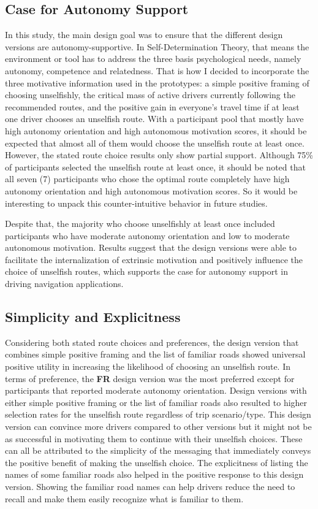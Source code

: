 \subsection{Case for Autonomy Support}
In this study, the main design goal was to ensure that the different design versions are autonomy-supportive. In Self-Determination Theory, that means the environment or tool has to address the three basis psychological needs, namely autonomy, competence and relatedness. That is how I decided to incorporate the three motivative information used in the prototypes: a simple positive framing of choosing unselfishly, the critical mass of active drivers currently following the recommended routes, and the positive gain in everyone's travel time if at least one driver chooses an unselfish route. With a participant pool that mostly have high autonomy orientation and high autonomous motivation scores, it should be expected that almost all of them would choose the unselfish route at least once. However, the stated route choice results only show partial support. Although 75\% of participants selected the unselfish route at least once, it should be noted that all seven (7) participants who chose the optimal route completely have high autonomy orientation and high autonomous motivation scores. So it would be interesting to unpack this counter-intuitive behavior in future studies. 

Despite that, the majority who choose unselfishly at least once included participants who have moderate autonomy orientation and low to moderate autonomous motivation. Results suggest that the design versions were able to facilitate the internalization of extrinsic motivation and positively influence the choice of unselfish routes, which supports the case for autonomy support in driving navigation applications.

\subsection{Simplicity and Explicitness}
Considering both stated route choices and preferences, the design version that combines simple positive framing and the list of familiar roads showed universal positive utility in increasing the likelihood of choosing an unselfish route. In terms of preference, the \textbf{FR} design version was the most preferred except for participants that reported moderate autonomy orientation. Design versions with either simple positive framing or the list of familiar roads also resulted to higher selection rates for the unselfish route regardless of trip scenario/type. This design version can convince more drivers compared to other versions but it might not be as successful in motivating them to continue with their unselfish choices. These can all be attributed to the simplicity of the messaging that immediately conveys the positive benefit of making the unselfish choice. The explicitness of listing the names of some familiar roads also helped in the positive response to this design version. Showing the familiar road names can help drivers reduce the need to recall and make them easily recognize what is familiar to them. 

